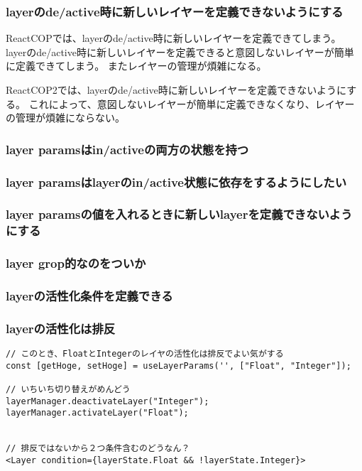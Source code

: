 \documentclass{jsarticle}
\begin{document}
\subsubsection{layerのde/active時に新しいレイヤーを定義できないようにする}
ReactCOPでは、layerのde/active時に新しいレイヤーを定義できてしまう。
layerのde/active時に新しいレイヤーを定義できると意図しないレイヤーが簡単に定義できてしまう。
またレイヤーの管理が煩雑になる。

ReactCOP2では、layerのde/active時に新しいレイヤーを定義できないようにする。
これによって、意図しないレイヤーが簡単に定義できなくなり、レイヤーの管理が煩雑にならない。


\subsubsection{layer paramsはin/activeの両方の状態を持つ}

\subsubsection{layer paramsはlayerのin/active状態に依存をするようにしたい}

\subsubsection{layer paramsの値を入れるときに新しいlayerを定義できないようにする}

\subsubsection{layer grop的なのをついか}

\subsubsection{layerの活性化条件を定義できる}

\subsubsection{layerの活性化は排反}
\begin{lstlisting}[caption=hoge,label=fuga]
// このとき、FloatとIntegerのレイヤの活性化は排反でよい気がする
const [getHoge, setHoge] = useLayerParams('', ["Float", "Integer"]);

// いちいち切り替えがめんどう
layerManager.deactivateLayer("Integer");
layerManager.activateLayer("Float");


// 排反ではないから２つ条件含むのどうなん？
<Layer condition={layerState.Float && !layerState.Integer}>
\end{lstlisting}
\end{document}
